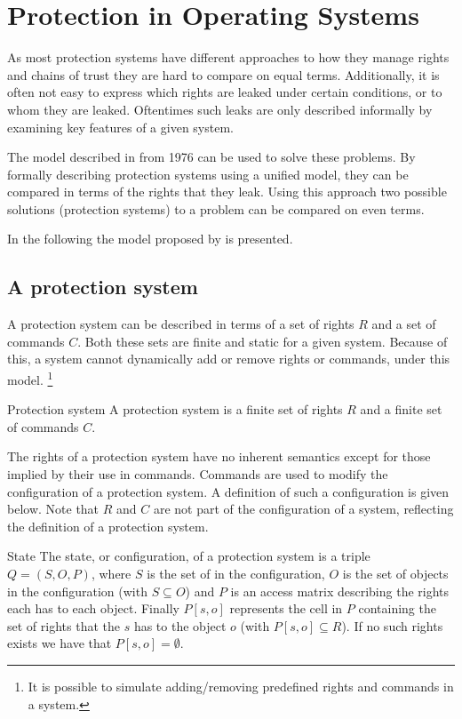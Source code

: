 \section{Protection in Operating Systems}
As most protection systems have different approaches to how they manage rights and chains of trust they are hard to compare on equal terms.
Additionally, it is often not easy to express which rights are leaked under certain conditions, or to whom they are leaked.
Oftentimes such leaks are only described informally by examining key features of a given system.

The model described in \citet{HRU} from 1976 can be used to solve these problems.
By formally describing protection systems using a unified model, they can be compared in terms of the rights that they leak.
Using this approach two possible solutions (protection systems) to a problem can be compared on even terms.

In the following the model proposed by \citet{HRU} is presented.

\subsection{A protection system}
A protection system can be described in terms of a set of rights $R$ and a set of commands $C$.
Both these sets are finite and static for a given system.
Because of this, a system cannot dynamically add or remove rights or commands, under this model.
\footnote{It is possible to simulate adding/removing predefined rights and commands in a system.}

\begin{definition}{Protection system}
  A protection system is a finite set of rights $R$ and a finite set of commands $C$.
\end{definition}

The rights of a protection system have no inherent semantics except for those implied by their use in commands.
Commands are used to modify the configuration of a protection system.
A definition of such a configuration is given below.
Note that $R$ and $C$ are not part of the configuration of a system, reflecting the definition of a protection system.

\begin{definition}{State}\label{protection:def:state}
The state, or configuration, of a protection system is a triple $Q = (S, O, P)$, where $S$ is the set of \subjects{} in the configuration, $O$ is the set of objects in the configuration (with $S \subseteq O$) and $P$ is an access matrix describing the rights each \ssubject{} has to each object.
Finally $P[s, o]$ represents the cell in $P$ containing the set of rights that the \ssubject{} $s$ has to the object $o$ (with $P[s, o] \subseteq R$).
If no such rights exists we have that $P[s,o] = \emptyset$.
\end{definition}

